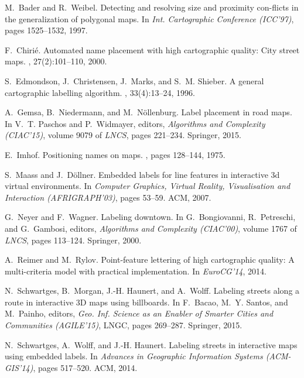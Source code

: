 \documentclass[a4paper,11pt]{article}
\begin{document}
{

\begin{thebibliography}{10}

M.~Bader and R.~Weibel.
\newblock Detecting and resolving size and proximity con-flicts in the
  generalization of polygonal maps.
\newblock In {\em Int. Cartographic Conference (ICC'97)}, pages 1525--1532,
  1997.

F.~Chiri\'{e}.
\newblock Automated name placement with high cartographic quality: City street
  maps.
, 27(2):101--110, 2000.

S.~Edmondson, J.~Christensen, J.~Marks, and S.~M. Shieber.
\newblock A general cartographic labelling algorithm.
, 33(4):13--24, 1996.

A.~Gemsa, B.~Niedermann, and M.~Nöllenburg.
\newblock Label placement in road maps.
\newblock In V.~T. Paschos and P.~Widmayer, editors, {\em Algorithms and
  Complexity (CIAC'15)}, volume 9079 of {\em LNCS}, pages 221--234. Springer,
  2015.

E.~Imhof.
\newblock Positioning names on maps.
, pages 128--144, 1975.

S.~Maass and J.~D\"{o}llner.
\newblock Embedded labels for line features in interactive 3d virtual
  environments.
\newblock In {\em Computer Graphics, Virtual Reality, Visualisation and
  Interaction (AFRIGRAPH'03)}, pages 53--59. ACM, 2007.

G.~Neyer and F.~Wagner.
\newblock Labeling downtown.
\newblock In G.~Bongiovanni, R.~Petreschi, and G.~Gambosi, editors, {\em
  Algorithms and Complexity (CIAC'00)}, volume 1767 of {\em LNCS}, pages
  113--124. Springer, 2000.

A.~Reimer and M.~Rylov.
\newblock Point-feature lettering of high cartographic quality: A
  multi-criteria model with practical implementation.
\newblock In {\em EuroCG'14}, 2014.

N.~Schwartges, B.~Morgan, J.-H. Haunert, and A.~Wolff.
\newblock Labeling streets along a route in interactive {3D} maps using
  billboards.
\newblock In F.~Bacao, M.~Y. Santos, and M.~Painho, editors, {\em Geo. Inf.
  Science as an Enabler of Smarter Cities and Communities (AGILE'15)}, LNGC,
  pages 269--287. Springer, 2015.

N.~Schwartges, A.~Wolff, and J.-H. Haunert.
\newblock Labeling streets in interactive maps using embedded labels.
\newblock In {\em Advances in Geographic Information Systems (ACM-GIS'14)},
  pages 517--520. ACM, 2014.


\end{thebibliography}}
\end{document}
